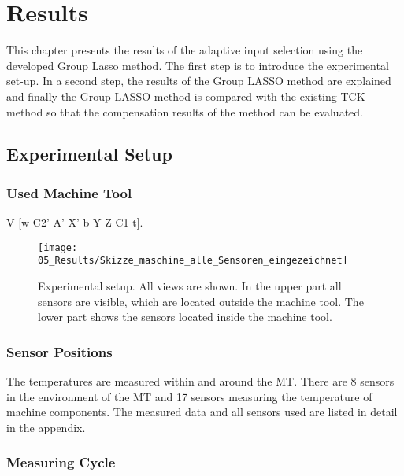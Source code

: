 \chapter{Results}
\label{chp:results}

This chapter presents the results of the adaptive input selection using the developed Group Lasso method. The first step is to introduce the experimental set-up. In a second step, the results of the Group LASSO method are explained and finally the Group LASSO method is compared with the existing TCK method so that the compensation results of the method can be evaluated.


\section{Experimental Setup}
\label{sec:experimental_setup}

\subsection{Used Machine Tool}
\label{sec:Used_Machine_Tool}

V [w C2' A' X' b Y Z C1 t].

\begin{figure}[!htb]
    \centering
    \texttt{[image: 05\_Results/Skizze\_maschine\_alle\_Sensoren\_eingezeichnet]} %
    \caption[Design of the machine]{Experimental setup. All views are shown. In the upper part all sensors are visible, which are located outside the machine tool. The lower part shows the sensors located inside the machine tool.}
    \label{fig:Design}
\end{figure}

\subsection{Sensor Positions}
\label{sec:Sensor_Positions}

The temperatures are measured within and around the MT. There are 8 sensors in the environment of the MT and 17 sensors measuring the temperature of machine components. The measured data and all sensors used are listed in detail in the appendix.


\subsection{Measuring Cycle}
\label{sec:measuring_cycle}

